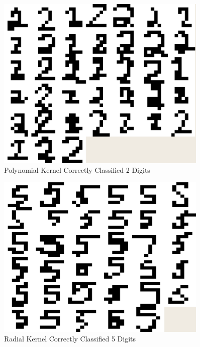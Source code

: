 \documentclass{article}
\begin{document}
\begin{figure}
\centering
\includegraphics[width=0.9\textwidth]{images/test2_5_correct2s_a0156.png}
\caption{Polynomial Kernel Correctly Classified 2 Digits}
\label{poly2correcttest}
\end{figure}

\begin{figure}
\centering
\includegraphics[width=0.9\textwidth]{images/test2_5_correct5_radial.png}
\caption{Radial Kernel Correctly Classified 5 Digits}
\label{radial5correcttest}
\end{figure}
\end{document}
